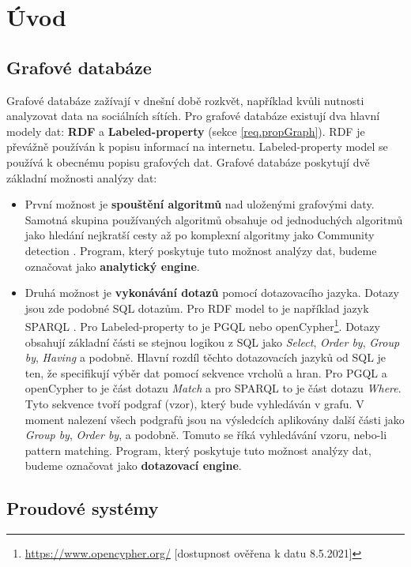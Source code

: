 \chapter*{Úvod}

\section*{Grafové databáze}

Grafové databáze zažívají v dnešní době rozkvět, například kvůli nutnosti analyzovat data na sociálních sítích.
Pro grafové databáze existují dva hlavní modely dat: \textbf{RDF} \citep{rdf} a \textbf{Labeled-property} (sekce \ref{req.propGraph}).
RDF je převážně používán k popisu informací na internetu. 
Labeled-property model se používá k obecnému popisu grafových dat.
Grafové databáze poskytují dvě základní možnosti analýzy dat:
\begin{itemize}
\item
První možnost je \textbf{spouštění algoritmů} nad uloženými grafovými daty.
Samotná skupina používaných algoritmů obsahuje od jednoduchých algoritmů jako hledání nejkratší cesty až po komplexní algoritmy jako Community detection \citep[str. 115]{graphAlg}.
Program, který poskytuje tuto možnost analýzy dat, budeme označovat jako \textbf{analytický engine}.
\item
Druhá možnost je \textbf{vykonávání dotazů} pomocí dotazovacího jazyka.
Dotazy jsou zde podobné SQL dotazům.
Pro RDF model to je například jazyk SPARQL \citep{sparql}.
Pro Labeled-property to je PGQL \citep{pgql} nebo openCypher\footnote{\url{https://www.opencypher.org/} [dostupnost ověřena k datu 8.5.2021]}.
Dotazy obsahují základní části se stejnou logikou z SQL jako \textit{Select}, \textit{Order by}, \textit{Group by}, \textit{Having} a podobně.
Hlavní rozdíl těchto dotazovacích jazyků od SQL je ten, že specifikují výběr dat pomocí sekvence vrcholů a hran.
Pro PGQL a openCypher to je část dotazu \textit{Match} a pro SPARQL to je část dotazu \textit{Where}.
Tyto sekvence tvoří podgraf (vzor), který bude vyhledáván v grafu.
V moment nalezení všech podgrafů jsou na výsledcích aplikovány další části jako \textit{Group by}, \textit{Order by}, a podobně.
Tomuto se říká vyhledávání vzoru, nebo-li pattern matching.
Program, který poskytuje tuto možnost analýzy dat, budeme označovat jako \textbf{dotazovací engine}.
\end{itemize}

\section*{Proudové systémy}

